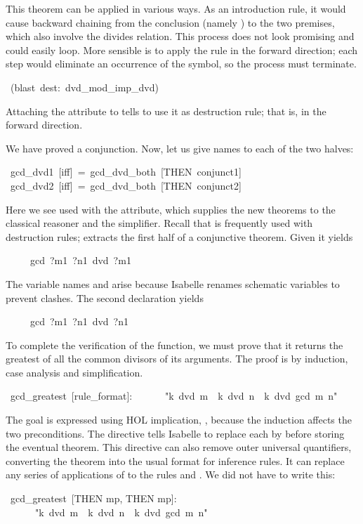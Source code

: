 %
This theorem can be applied in various ways.  As an introduction rule, it
would cause backward chaining from  the conclusion (namely
) to the two premises, which 
also involve the divides relation. This process does not look promising
and could easily loop.  More sensible is  to apply the rule in the forward
direction; each step would eliminate an occurrence of the  symbol, so the
process must terminate.  
\begin{isabelle}
\ (blast\ dest:\ dvd_mod_imp_dvd)\isanewline
{}
\end{isabelle}
Attaching the  attribute to  tells
 to use it as destruction rule; that is, in the forward direction.

\medskip
We have proved a conjunction.  Now, let us give names to each of the
two halves:
\begin{isabelle}
\ gcd_dvd1\ [iff]\ =\ gcd_dvd_both\ [THEN\ conjunct1]\isanewline
{}\ gcd_dvd2\ [iff]\ =\ gcd_dvd_both\ [THEN\ conjunct2]%
\end{isabelle}
Here we see 
used with the  attribute, which supplies the new theorems to the
classical reasoner and the simplifier.  Recall that  is
frequently used with destruction rules;  extracts the
first half of a conjunctive theorem.  Given  it yields
\begin{isabelle}
\ \ \ \ \ gcd\ ?m1\ ?n1\ dvd\ ?m1
\end{isabelle}
The variable names  and  arise because
Isabelle renames schematic variables to prevent 
clashes.  The second  declaration yields
\begin{isabelle}
\ \ \ \ \ gcd\ ?m1\ ?n1\ dvd\ ?n1
\end{isabelle}

\medskip
To complete the verification of the  function, we must 
prove that it returns the greatest of all the common divisors 
of its arguments.  The proof is by induction, case analysis and simplification.
\begin{isabelle}
\ gcd\_greatest\ [rule\_format]:\isanewline
\ \ \ \ \ \ "k\ dvd\ m\ \isasymlongrightarrow \ k\ dvd\ n\ \isasymlongrightarrow \ k\ dvd\ gcd\ m\ n"
\end{isabelle}
%
The goal is expressed using HOL implication,
\isa{\isasymlongrightarrow}, because the induction affects the two
preconditions.  The directive  tells Isabelle to replace
each \isa{\isasymlongrightarrow} by \isa{\isasymLongrightarrow} before
storing the eventual theorem.  This directive can also remove outer
universal quantifiers, converting the theorem into the usual format for
inference rules.  It can replace any series of applications of
 to the rules  and .  We did not have to
write this:
\begin{isabelle}
\ gcd_greatest\
[THEN mp, THEN mp]:\isanewline
\ \ \ \ \ \ "k\ dvd\ m\ \isasymlongrightarrow \ k\ dvd\ n\ \isasymlongrightarrow \ k\ dvd\ gcd\ m\ n"
\end{isabelle}

